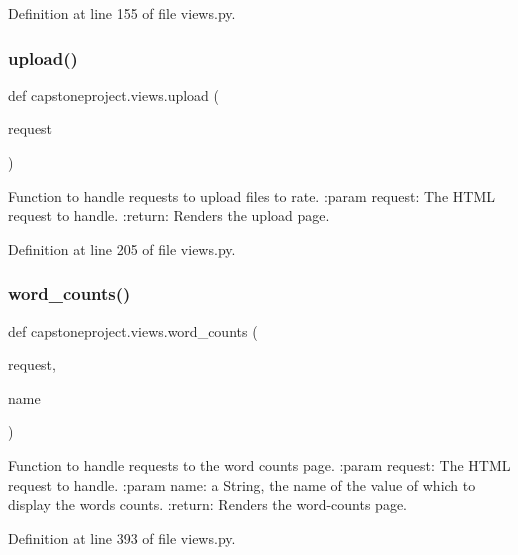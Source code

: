 Definition at line 155 of file views.\+py.

\mbox{\label{namespacecapstoneproject_1_1views_af47e5c830c3e892309d9e256f315e14f}} 
\subsubsection{\texorpdfstring{upload()}{upload()}}
{\footnotesize\ttfamily def capstoneproject.\+views.\+upload (\begin{DoxyParamCaption}\item[{}]{request }\end{DoxyParamCaption})}

\begin{DoxyVerb}Function to handle requests to upload files to rate.
:param request: The HTML request to handle.
:return: Renders the upload page.
\end{DoxyVerb}
 

Definition at line 205 of file views.\+py.

\mbox{\label{namespacecapstoneproject_1_1views_acfe1fcc1fc3f0f4779b31f28830ee379}} 
\subsubsection{\texorpdfstring{word\+\_\+counts()}{word\_counts()}}
{\footnotesize\ttfamily def capstoneproject.\+views.\+word\+\_\+counts (\begin{DoxyParamCaption}\item[{}]{request,  }\item[{}]{name }\end{DoxyParamCaption})}

\begin{DoxyVerb}Function to handle requests to the word counts page.
:param request: The HTML request to handle.
:param name: a String, the name of the value of which to display the words counts.
:return: Renders the word-counts page.
\end{DoxyVerb}
 

Definition at line 393 of file views.\+py.

